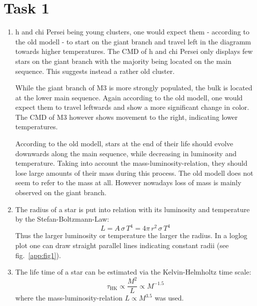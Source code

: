 \documentclass[11pt,a4paper]{scrartcl}
\newcommand*{\figref}[1]{(see fig.~\ref{#1})}
\newcommand{\tlabel}[1]{\ensuremath{\tau_{\mathrm{#1}}}}
\begin{document}
\section*{Task 1}

\begin{enumerate}[label=\textbf{\large(\alph*)}, itemsep=\baselineskip]

\item
    h and chi Persei being young clusters, one would expect them - according to
    the old modell - to start on the giant branch and travel left in the
    diagramm towards higher temperatures.
    The CMD of h and chi Persei only displays few stars on the giant branch
    with the majority being located on the main sequence. This suggests instead
    a rather old cluster.

    While the giant branch of M3 is more strongly populated, the bulk is
    located at the lower main sequence.
    Again according to the old modell, one would expect them to travel
    leftwards and show a more significant change in color.
    The CMD of M3 however shows movement to the right, indicating lower
    temperatures.

    According to the old modell, stars at the end of their life should evolve
    downwards along the main sequence, while decreasing in luminosity and
    temperature. Taking into account the mass-luminosity-relation, they should
    lose large amounts of their mass during this process.
    The old modell does not seem to refer to the mass at all. However nowadays
    loss of mass is mainly observed on the giant branch.


\item
    The radius of a star is put into relation with its luminosity and
    temperature by the Stefan-Boltzmann-Law:
    \begin{equation*}
        L = A\,\sigma\,T^4 = 4\pi\,r^2\,\sigma\,T^4
    \end{equation*}
    Thus the larger luminosity or temperature the larger the radius.
    In a loglog plot one can draw straight parallel lines indicating constant
    radii \figref{app:fig1}.


\item
    The life time of a star can be estimated via the Kelvin-Helmholtz time
    scale:
    \begin{equation*}
        \tlabel{HK} \propto \frac{M^2}{L} \propto M^{-1.5}
    \end{equation*}
    where the mass-luminosity-relation $L \propto M^{3.5}$ was used.


\end{enumerate}
\end{document}
